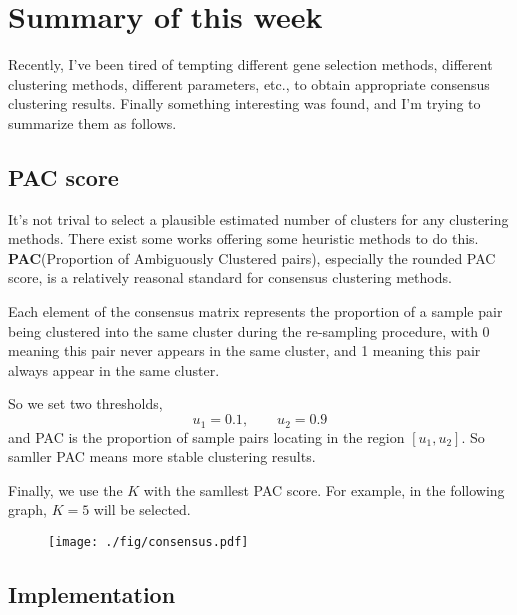 \documentclass[12pt]{article}
\begin{document}
\section*{Summary of this week}

Recently, I've been tired of tempting different gene selection methods,
different clustering methods, different parameters, etc., to obtain appropriate
consensus clustering results. Finally something interesting was found, and I'm trying
to summarize them as follows.

\subsection*{PAC score}
It's not trival to select a plausible estimated number of clusters for any
clustering methods. There exist some works
offering some heuristic methods to do this. {\bf \color{blue}PAC}(Proportion of
Ambiguously Clustered pairs), especially the rounded PAC score, is a relatively
reasonal standard for consensus clustering methods. 

\vspace{5pt}
Each element of the consensus matrix represents the proportion of
a sample pair being clustered into the same cluster during the re-sampling
procedure, with 0 meaning this pair never appears in the same cluster, and 1
meaning this pair always appear in the same cluster.

\vspace{5pt}
So we set two thresholds,
\[ u_1=0.1,\qquad u_2=0.9 \]
and PAC is the proportion of sample pairs locating in the region $[u_1,u_2]$. So
samller PAC means more stable clustering results.

\vspace{5pt}
Finally, we use the $K$ with the samllest PAC score. For example, in the
following graph, $K=5$ will be selected.

\begin{figure}[!h]
  \centering
  \texttt{[image: ./fig/consensus.pdf]}
 \end{figure}

 \subsection*{Implementation}
\end{document}
